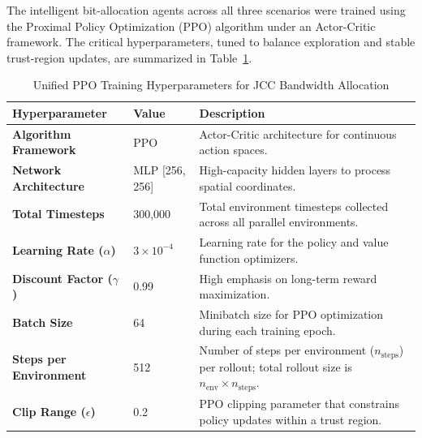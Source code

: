 The intelligent bit-allocation agents across all three scenarios were trained using the Proximal Policy Optimization (PPO) algorithm under an Actor-Critic framework. The critical hyperparameters, tuned to balance exploration and stable trust-region updates, are summarized in Table~\ref{tab:ppo_hyperparameters}.
\begin{table}[H]
\centering
\caption{Unified PPO Training Hyperparameters for JCC Bandwidth Allocation}
\label{tab:ppo_hyperparameters}
\renewcommand{\arraystretch}{1.5} %
\begin{tabular}{@{}llp{8.5cm}@{}}
\toprule
\textbf{Hyperparameter} & \textbf{Value} & \textbf{Description} \\
\midrule
\textbf{Algorithm Framework} & PPO & Actor-Critic architecture for continuous action spaces. \\
\textbf{Network Architecture} & MLP [256, 256] & High-capacity hidden layers to process spatial coordinates. \\
\textbf{Total Timesteps} & 300,000 & Total environment timesteps collected across all parallel environments. \\
\textbf{Learning Rate ($\alpha$)} & $3 \times 10^{-4}$ & Learning rate for the policy and value function optimizers. \\
\textbf{Discount Factor ($\gamma$)} & 0.99 & High emphasis on long-term reward maximization. \\
\textbf{Batch Size} & 64 & Minibatch size for PPO optimization during each training epoch. \\
\textbf{Steps per Environment} & 512 & Number of steps per environment ($n_{\text{steps}}$) per rollout; total rollout size is $n_{\text{env}} \times n_{\text{steps}}$. \\
\textbf{Clip Range ($\epsilon$)} & 0.2 & PPO clipping parameter that constrains policy updates within a trust region. \\
\bottomrule
\end{tabular}
\end{table}

